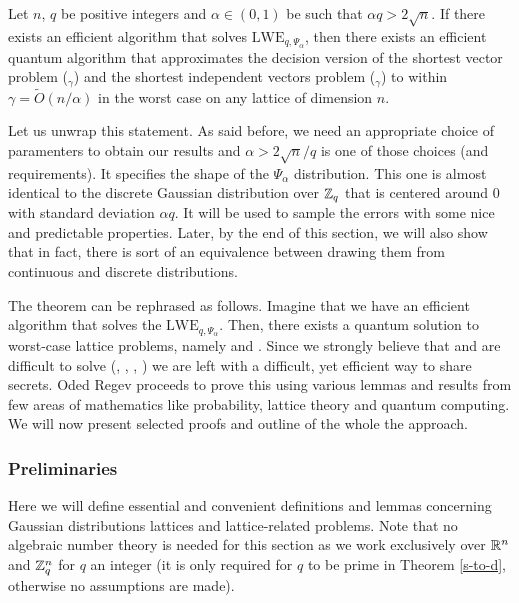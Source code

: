 \begin{theorem}\label{main}
        Let $n$, $q$ be positive integers and $\alpha \in (0, 1)$ be such that $\alpha q > 2 \sqrt{n}$. If there exists an efficient algorithm that solves $\text{LWE}_{q, \Psi_{\alpha}}$, then there exists an efficient quantum algorithm that approximates the decision version of the shortest vector problem ($_{\gamma}$) and the shortest independent vectors problem ($_{\gamma}$) to within $\gamma = \tilde{O}(n/\alpha)$ in the worst case on any lattice of dimension $n$. 
\end{theorem}

Let us unwrap this statement. As said before, we need an appropriate choice of paramenters to obtain our results and $\alpha > 2\sqrt{n}/q$ is one of those choices (and requirements). It specifies the shape of the $\Psi_{\alpha}$ distribution. This one is almost identical to the discrete Gaussian distribution over $\mathbb{Z}_q$ that is centered around 0 with standard deviation $\alpha q$. It will be used to sample the errors with some nice and predictable properties. Later, by the end of this section, we will also show that in fact, there is sort of an equivalence between drawing them from continuous and discrete distributions.

The theorem can be rephrased as follows. Imagine that we have an efficient algorithm that solves the $\text{LWE}_{q, \Psi_{\alpha}}$. Then, there exists a quantum solution to worst-case lattice problems, namely  and . Since we strongly believe that  and  are difficult to solve (\cite{svp-hard}, \cite{reductions}, \cite{cvp-hard}, \cite{lbc}) we are left with a difficult, yet efficient way to share secrets. Oded Regev proceeds to prove this using various lemmas and results from few areas of mathematics like probability, lattice theory and quantum computing. We will now present selected proofs and outline of the whole the approach.

\subsubsection{Preliminaries}
Here we will define essential and convenient definitions and lemmas concerning Gaussian distributions lattices and lattice-related problems. Note that no algebraic number theory is needed for this section as we work exclusively over $\mathbb{R}^n$ and $\mathbb{Z}^n_q$ for $q$ an integer (it is only required for $q$ to be prime in Theorem \ref{s-to-d}, otherwise no assumptions are made). 

